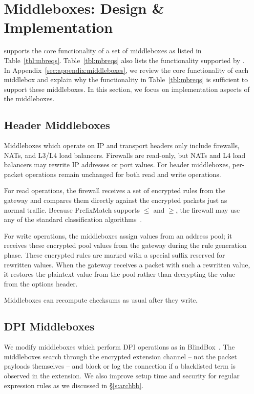

\section{Middleboxes: Design \& Implementation}
\label{sec:mbs}

 \sys supports the core functionality of a set of middleboxes as listed in Table~\ref{tbl:mbreqs}.
Table~\ref{tbl:mbreqs} also lists the functionality supported by \sys.   In Appendix~\ref{sec:appendix:middleboxes}, we review the core functionality of each middlebox
  and explain why the functionality in Table~\ref{tbl:mbreqs} is sufficient to support these middleboxes. 
 In this section, we focus on implementation aspects of the middleboxes.



\subsection{Header Middleboxes}
Middleboxes which operate on IP and transport headers only include firewalls, NATs, and L3/L4 load balancers.
Firewalls are read-only, but NATs and L4 load balancers may rewrite IP addresses or port values. 
For header middleboxes, per-packet operations remain unchanged for both read and write operations.

For read operations, the firewall receives a set of encrypted rules from the gateway and compares them directly against the encrypted packets just as normal traffic. Because PrefixMatch supports $\leq$ and $\geq$, the firewall may use any of the standard classification algorithms~\cite{packet_classif}.




For write operations, the middleboxes assign values from an address pool; it receives these encrypted pool values from the gateway during the rule generation phase.
These encrypted rules are marked with a special suffix reserved for rewritten values.
When the gateway receives a packet with such a rewritten value, it restores the plaintext value from the pool rather than decrypting the value from the options header. 

Middleboxes can recompute checksums as usual after they write.

\subsection{DPI Middleboxes}
We modify middleboxes which perform DPI operations as in BlindBox~\cite{blindbox}. 
The middleboxes search through the encrypted extension channel -- not the packet payloads themselves -- and block or log the connection if a blacklisted term is observed in the extension.
We also improve setup time and security for regular expression rules as we discussed in \S\ref{s:archbb}.

